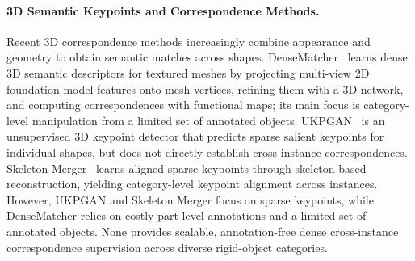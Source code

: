 \paragraph{3D Semantic Keypoints and Correspondence Methods.}
Recent 3D correspondence methods increasingly combine appearance and geometry to obtain semantic matches across shapes. DenseMatcher~\cite{zhu2025densematcher} learns dense 3D semantic descriptors for textured meshes by projecting multi-view 2D foundation-model features onto mesh vertices, refining them with a 3D network, and computing correspondences with functional maps; its main focus is category-level manipulation from a limited set of annotated objects. UKPGAN~\cite{you2022ukpgan} is an unsupervised 3D keypoint detector that predicts sparse salient keypoints for individual shapes, but does not directly establish cross-instance correspondences. Skeleton Merger~\cite{shi2021skeletonmerger} learns aligned sparse keypoints through skeleton-based reconstruction, yielding category-level keypoint alignment across instances. However, UKPGAN and Skeleton Merger focus on sparse keypoints,
while DenseMatcher relies on costly part-level annotations
and a limited set of annotated objects. None provides scalable,
annotation-free dense cross-instance correspondence supervision
across diverse rigid-object categories.
